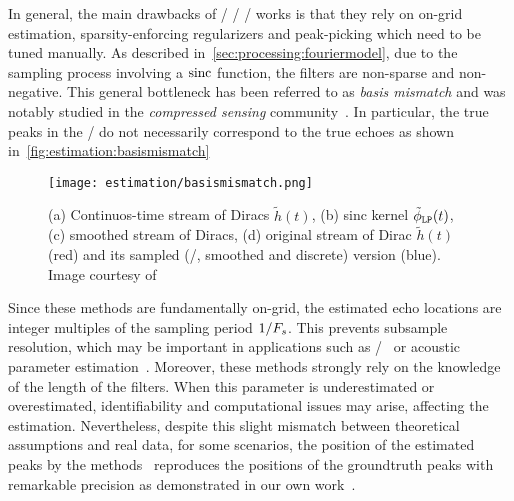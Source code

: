 \mynewline
In general, the main drawbacks of \FIR/ \SIMO/ \BCE/ works is that they rely on on-grid estimation, sparsity-enforcing regularizers and peak-picking which need to be tuned manually.
As described in~\cref{sec:processing:fouriermodel}, due to the sampling process involving a $\operatorname*{sinc}$ function, the filters are non-sparse and non-negative.
This general bottleneck has been referred to as \textit{basis mismatch} and was notably studied in the \textit{compressed sensing} community~.
In particular, the true peaks in the \RIR/ do not necessarily correspond to the true echoes as shown in~\cref{fig:estimation:basismismatch}
\begin{figure}[h]
    \begin{fullwidth}
        \centering
        \texttt{[image: estimation/basismismatch.png]}
        \caption{%
        (a) Continuos-time stream of Diracs $\tilde{h}(t)$,
        (b) sinc kernel $\lowpassfilter(t)$,
        (c) smoothed stream of Diracs,
        (d) original stream of Dirac $\tilde{h}(t)$ (red) and its sampled (\ie/, smoothed and discrete) version (blue).
        Image courtesy of~
        }
        \label{fig:estimation:mismatch}
    \end{fullwidth}
\end{figure}
Since these methods are fundamentally on-grid, the estimated echo locations are integer multiples of the sampling period $1/F_s$.
This prevents subsample resolution, which may be important in applications such as \RooGE/~ or acoustic parameter estimation~.
Moreover, these methods strongly rely on the knowledge of the length of the filters.
When this parameter is underestimated or overestimated, identifiability and computational issues may arise, affecting the estimation.
Nevertheless, despite this slight mismatch between theoretical assumptions and real data, for some scenarios, the position of the estimated peaks by the methods~ reproduces the positions of the groundtruth peaks with remarkable precision as demonstrated in our own work~\cite{di2020blaster}.

